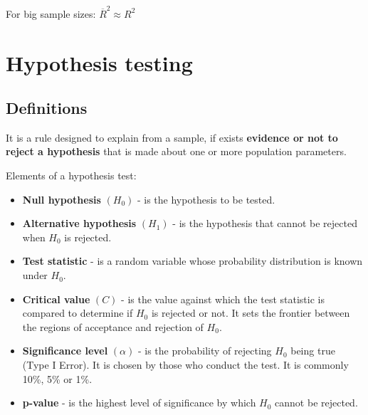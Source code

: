 \documentclass[10pt, a4paper, landscape]{article}
\begin{document}
\begin{multicols}{3}
For big sample sizes: \( \overline{R}^{2} \approx R^{2} \)

\section*{Hypothesis testing}

\subsection*{Definitions}

It is a rule designed to explain from a sample, if exists \textbf{evidence or not to reject a hypothesis} that is made about one or more population parameters.

Elements of a hypothesis test:

\begin{itemize}[leftmargin=*]
	\item \textbf{Null hypothesis} \( (H_{0}) \) - is the hypothesis to be tested.
	\item \textbf{Alternative hypothesis} \( (H_{1}) \) - is the hypothesis that cannot be rejected when \( H_{0} \) is rejected.
	\item \textbf{Test statistic} - is a random variable whose probability distribution is known under \( H_{0} \).
	\item \textbf{Critical value} \( (C) \) - is the value against which the test statistic is compared to determine if \( H_{0} \) is rejected or not. It sets the frontier between the regions of acceptance and rejection of \( H_{0} \).
	\item \textbf{Significance level} \( (\alpha) \) - is the probability of rejecting \( H_{0} \) being true (Type I Error). It is chosen by those who conduct the test. It is commonly 10\%, 5\% or 1\%.
	\item \textbf{p-value} - is the highest level of significance by which \( H_{0} \) cannot be rejected.
\end{itemize}

\setlength{\multicolsep}{0pt}
\setlength{\columnsep}{20pt}
\begin{multicols}{2}



\end{multicols}
\end{multicols}
\end{document}
